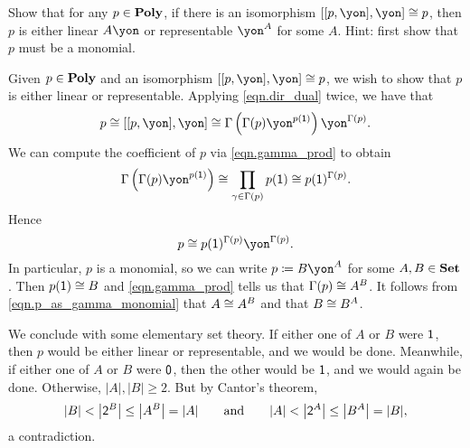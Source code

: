 \documentclass[Book-Poly]{subfiles}
\begin{document}
\begin{exercise}
Show that for any $p\in\mathbf{Poly}$, if there is an isomorphism $\ihom{\ihom{p,\yon},\yon} \iso p$, then $p$ is either linear $A\yon$ or representable $\yon^A$ for some $A$. Hint: first show that $p$ must be a monomial.
\begin{solution}
Given $p \in \mathbf{Poly}$ and an isomorphism $\ihom{\ihom{p,\yon},\yon} \iso p$, we wish to show that $p$ is either linear or representable.
Applying \eqref{eqn.dir_dual} twice, we have that
\[
    p \iso \ihom{\ihom{p,\yon},\yon} \iso \Gamma\left(\Gamma(p)\yon^{p(\1)}\right)\yon^{\Gamma(p)}.
\]
We can compute the coefficient of $p$ via \eqref{eqn.gamma_prod} to obtain
\[
    \Gamma\left(\Gamma(p)\yon^{p(\1)}\right) \iso \prod_{\gamma \in \Gamma(p)} p(\1) \iso p(\1)^{\Gamma(p)}.
\]
Hence
\begin{equation} \label{eqn.p_as_gamma_monomial}
    p \iso p(\1)^{\Gamma(p)}\yon^{\Gamma(p)}.
\end{equation}
In particular, $p$ is a monomial, so we can write $p \coloneqq B\yon^A$ for some $A,B \in \mathbf{Set}$.
Then $p(\textsf{1}) \cong B$ and \eqref{eqn.gamma_prod} tells us that $\Gamma(p) \cong A^B$.
It follows from \eqref{eqn.p_as_gamma_monomial} that $A \cong A^B$ and that $B \cong B^A$.

We conclude with some elementary set theory.
If either one of $A$ or $B$ were $\textsf{1}$, then $p$ would be either linear or representable, and we would be done.
Meanwhile, if either one of $A$ or $B$ were $\textsf{0}$, then the other would be $\textsf{1}$, and we would again be done.
Otherwise, $|A|,|B| \geq 2$.
But by Cantor's theorem,
\[
    |B| < \big|\textsf{2}^B\big| \leq \big|A^B\big| = |A| \qquad\text{and}\qquad |A| < \big|\textsf{2}^A\big| \leq \big|B^A\big| = |B|,
\]
a contradiction.
\end{solution}
\end{exercise}
\end{document}
